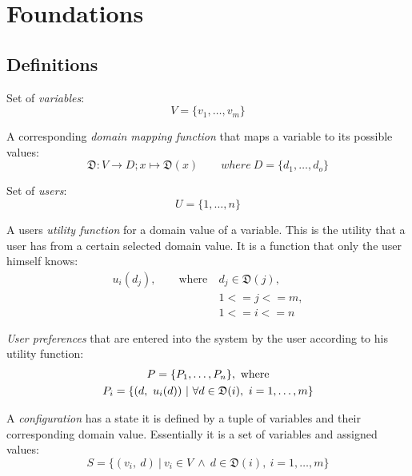\chapter{Foundations}
\label{ch:Foundations}

\section{Definitions}
\label{sec:Foundations:Definitions}

Set of \emph{variables}:
\begin{equation}
    V = \{v_1, \dotsc, v_m\}
\end{equation}

A corresponding \emph{domain mapping function} that maps a variable to its possible values:
\begin{equation}
    \mathfrak{D} : V \to D; x \mapsto \mathfrak{D}(x) \qquad where \ D = \{d_1, \dotsc, d_o\}
\end{equation}

Set of \emph{users}:
\begin{equation}
    U = \{1, \dotsc, n\}
\end{equation}

A users \emph{utility function} for a domain value of a variable. This is the utility that a user has from a certain selected domain value. It is a function that only the user himself knows:
\begin{equation}
    \begin{split}
        u_i(d_j), \qquad \text{where}\ & d_j \in  \mathfrak{D}(j),\\
        & 1 <= j <= m, \\
        & 1 <= i <= n
    \end{split}
\end{equation}

\emph{User preferences} that are entered into the system by the user according to his utility function:
\begin{gather}
    P = \{ P_1, \dotsc, P_n\},\ \text{where} \\
    P_i = \{(d,\ u_i(d)) \ | \ \forall d \in \mathfrak{D}(i),\ i=1,\dotsc,m \} \notag
\end{gather}

A \emph{configuration} has a state it is defined by a tuple of variables and their corresponding domain value. Essentially it is a set of variables and assigned values:
\begin{equation}
    S = \{ (v_i,\ d) \ |\ v_i \in V \ \land \ d \in \mathfrak{D}(i),\ i=1,\dotsc,m \}
\end{equation}

